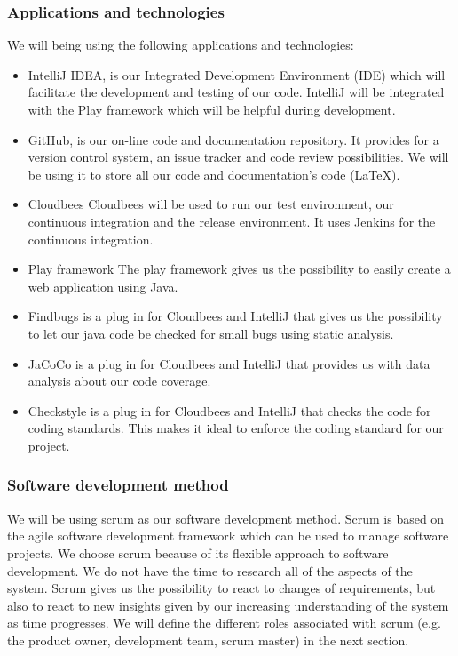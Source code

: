 \documentclass[]{article}
\begin{document}
\subsubsection{Applications and technologies}
We will being using the following applications and technologies:
\begin{itemize}
\item IntelliJ IDEA, is our Integrated Development Environment (IDE) which will facilitate the development and testing of our code.
IntelliJ will be integrated with the Play framework which will be helpful during development.
\item GitHub, is our on-line code and documentation repository.
It provides for a version control system, an issue tracker and code review possibilities.
We will be using it to store all our code and documentation's code (LaTeX).
\item Cloudbees
Cloudbees will be used to run our test environment, our continuous integration and the release environment.
It uses Jenkins for the continuous integration.
\item Play framework
The play framework gives us the possibility to easily create a web application using Java.
\item Findbugs is a plug in for Cloudbees and IntelliJ that gives us the possibility to let our java code be checked for small bugs using static analysis.
\item JaCoCo is a plug in for Cloudbees and IntelliJ that provides us with data analysis about our code coverage.
\item Checkstyle is a plug in for Cloudbees and IntelliJ that checks the code for coding standards.
This makes it ideal to enforce the coding standard for our project.
\end{itemize}

\subsubsection{Software development method}
We will be using scrum as our software development method.
Scrum is based on the agile software development framework which can be used to manage software projects.
We choose scrum because of its flexible approach to software development.
We do not have the time to research all of the aspects of the system.
Scrum gives us the possibility to react to changes of requirements, but also to react to new insights given by our increasing understanding of the system as time progresses.
We will define the different roles associated with scrum (e.g. the product owner, development team, scrum master) in the next section.
\end{document}
